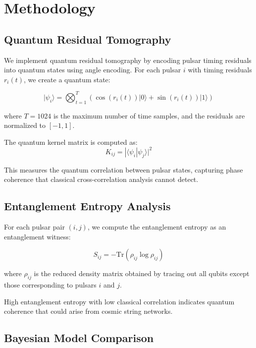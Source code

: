 \documentclass[12pt,a4paper]{article}
\begin{document}
\section{Methodology}

\subsection{Quantum Residual Tomography}

We implement quantum residual tomography by encoding pulsar timing residuals into quantum states using angle encoding. For each pulsar $i$ with timing residuals $r_i(t)$, we create a quantum state:

\begin{equation}
|\psi_i\rangle = \bigotimes_{t=1}^{T} \left(\cos(r_i(t))|0\rangle + \sin(r_i(t))|1\rangle\right)
\end{equation}

where $T = 1024$ is the maximum number of time samples, and the residuals are normalized to $[-1, 1]$.

The quantum kernel matrix is computed as:
\begin{equation}
K_{ij} = |\langle\psi_i|\psi_j\rangle|^2
\end{equation}

This measures the quantum correlation between pulsar states, capturing phase coherence that classical cross-correlation analysis cannot detect.

\subsection{Entanglement Entropy Analysis}

For each pulsar pair $(i,j)$, we compute the entanglement entropy as an entanglement witness:

\begin{equation}
S_{ij} = -\text{Tr}(\rho_{ij} \log \rho_{ij})
\end{equation}

where $\rho_{ij}$ is the reduced density matrix obtained by tracing out all qubits except those corresponding to pulsars $i$ and $j$.

High entanglement entropy with low classical correlation indicates quantum coherence that could arise from cosmic string networks.

\subsection{Bayesian Model Comparison}
\end{document}
